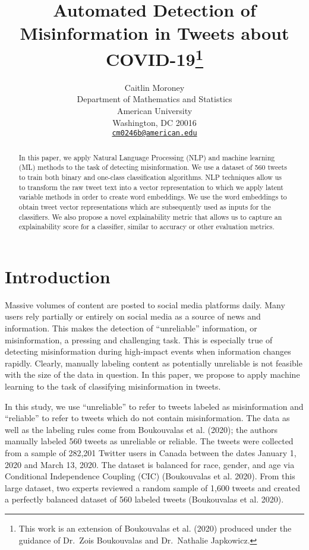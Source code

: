 \documentclass{article}
\title{Automated Detection of Misinformation in Tweets about COVID-19\footnote{This
  work is an extension of Boukouvalas et al. (2020) produced under the
  guidance of Dr.~Zois Boukouvalas and Dr.~Nathalie Japkowicz.}}
\author{
    Caitlin Moroney
   \\
    Department of Mathematics and Statistics \\
    American University \\
  Washington, DC 20016 \\
  \texttt{\href{mailto:cm0246b@american.edu}{\nolinkurl{cm0246b@american.edu}}} \\
  }
\begin{document}
\maketitle

\def\tightlist{}


\begin{abstract}
In this paper, we apply Natural Language Processing (NLP) and machine
learning (ML) methods to the task of detecting misinformation. We use a
dataset of 560 tweets to train both binary and one-class classification
algorithms. NLP techniques allow us to transform the raw tweet text into
a vector representation to which we apply latent variable methods in
order to create word embeddings. We use the word embeddings to obtain
tweet vector representations which are subsequently used as inputs for
the classifiers. We also propose a novel explainability metric that
allows us to capture an explainability score for a classifier, similar
to accuracy or other evaluation metrics.
\end{abstract}


\hypertarget{introduction}{%
\section{Introduction}\label{introduction}}

Massive volumes of content are posted to social media platforms daily.
Many users rely partially or entirely on social media as a source of
news and information. This makes the detection of ``unreliable''
information, or misinformation, a pressing and challenging task. This is
especially true of detecting misinformation during high-impact events
when information changes rapidly. Clearly, manually labeling content as
potentially unreliable is not feasible with the size of the data in
question. In this paper, we propose to apply machine learning to the
task of classifying misinformation in tweets.

In this study, we use ``unreliable'' to refer to tweets labeled as
misinformation and ``reliable'' to refer to tweets which do not contain
misinformation. The data as well as the labeling rules come from
Boukouvalas et al. (2020); the authors manually labeled 560 tweets as
unreliable or reliable. The tweets were collected from a sample of
282,201 Twitter users in Canada between the dates January 1, 2020 and
March 13, 2020. The dataset is balanced for race, gender, and age via
Conditional Independence Coupling (CIC) (Boukouvalas et al. 2020). From
this large dataset, two experts reviewed a random sample of 1,600 tweets
and created a perfectly balanced dataset of 560 labeled tweets
(Boukouvalas et al. 2020).
\end{document}
